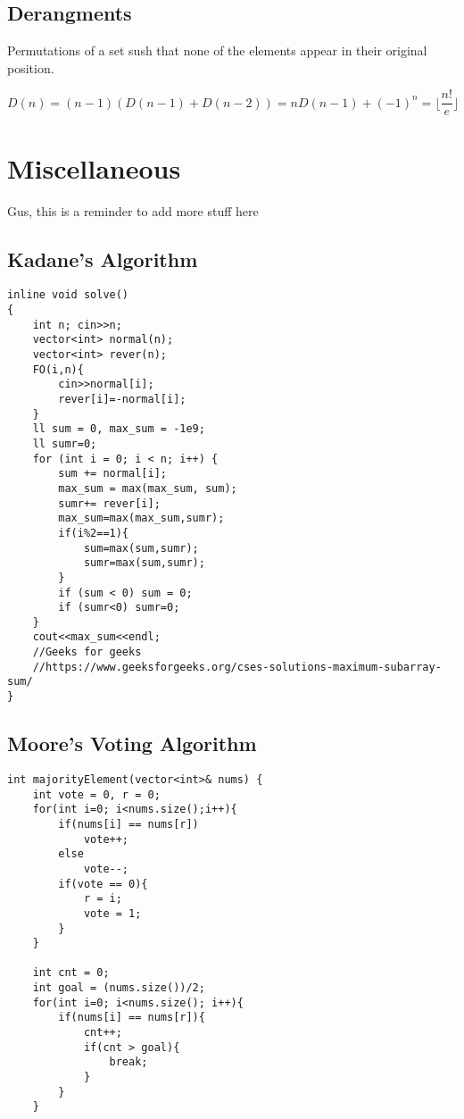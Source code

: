 \documentclass[10pt]{article}
\begin{document}
\begin{multicols*}{2}
\subsection{Derangments}

Permutations of a set sush that none of the elements appear in their original position.

\[
D(n) = (n-1)(D(n-1)+D(n-2)) = nD(n-1)+(-1)^n = \lfloor \frac{n!}{e}\rfloor
\]

\section{Miscellaneous}

Gus, this is a reminder to add more stuff here

\subsection{Kadane's Algorithm}
\begin{lstlisting}[style=compactcpp]
inline void solve()
{
    int n; cin>>n;
    vector<int> normal(n);
    vector<int> rever(n);
    FO(i,n){
        cin>>normal[i];
        rever[i]=-normal[i];
    }
    ll sum = 0, max_sum = -1e9;
    ll sumr=0;
    for (int i = 0; i < n; i++) {
        sum += normal[i];
        max_sum = max(max_sum, sum);
        sumr+= rever[i];
        max_sum=max(max_sum,sumr);
        if(i%2==1){
            sum=max(sum,sumr);
            sumr=max(sum,sumr);
        }
        if (sum < 0) sum = 0;
        if (sumr<0) sumr=0;
    }
    cout<<max_sum<<endl;
    //Geeks for geeks
    //https://www.geeksforgeeks.org/cses-solutions-maximum-subarray-sum/
}
\end{lstlisting}

\subsection{Moore's Voting Algorithm}

\begin{lstlisting}[style=compactcpp]
int majorityElement(vector<int>& nums) {
    int vote = 0, r = 0;
    for(int i=0; i<nums.size();i++){
        if(nums[i] == nums[r])
            vote++;
        else
            vote--;
        if(vote == 0){
            r = i;
            vote = 1;
        } 
    }

    int cnt = 0;
    int goal = (nums.size())/2;
    for(int i=0; i<nums.size(); i++){
        if(nums[i] == nums[r]){
            cnt++;
            if(cnt > goal){
                break;
            }
        }
    }


\end{lstlisting}
\end{multicols*}
\end{document}
